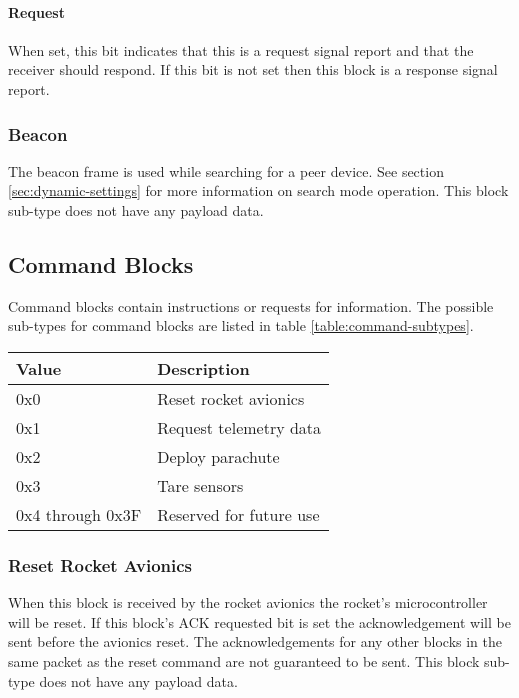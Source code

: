 \paragraph{Request}
When set, this bit indicates that this is a request signal report and that the receiver should respond. If this bit is
not set then this block is a response signal report.

\subsubsection{Beacon}
The beacon frame is used while searching for a peer device. See section \ref{sec:dynamic-settings} for more information
on search mode operation. This block sub-type does not have any payload data.

\subsection{Command Blocks}
Command blocks contain instructions or requests for information. The possible sub-types for command blocks are listed
in table \ref{table:command-subtypes}.

\begin{table*}[htb]
    \centering
    \begin{tabular}{@{}ll@{}}
        \toprule
        Value            & Description             \\
        \midrule
        0x0              & Reset rocket avionics   \\
        0x1              & Request telemetry data  \\
        0x2              & Deploy parachute        \\
        0x3              & Tare sensors            \\
        0x4 through 0x3F & Reserved for future use \\
        \bottomrule
    \end{tabular}
    \caption{Command Block Sub-types}
    \label{table:command-subtypes}
\end{table*}

\subsubsection{Reset Rocket Avionics}
When this block is received by the rocket avionics the rocket’s microcontroller will be reset. If this block’s ACK
requested bit is set the acknowledgement will be sent before the avionics reset. The acknowledgements for any other
blocks in the same packet as the reset command are not guaranteed to be sent. This block sub-type does not have any
payload data.

